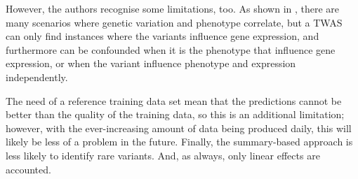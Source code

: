 \documentclass[../main.tex]{subfiles}
\begin{document}
However, the authors recognise some limitations, too. As shown in 
, there are many scenarios where genetic variation 
and phenotype correlate, but a TWAS can only find instances where the 
variants influence gene expression, and furthermore can be confounded 
when it is the phenotype that influence gene expression, or when the 
variant influence phenotype and expression independently.

The need of a reference training data set mean that the predictions 
cannot be better than the quality of the training data, so this is an 
additional limitation; however, with the ever-increasing amount of data 
being produced daily, this will likely be less of a problem in the 
future. Finally, the summary-based approach is less likely to identify 
rare variants. And, as always, only linear effects are 
accounted.
\end{document}
